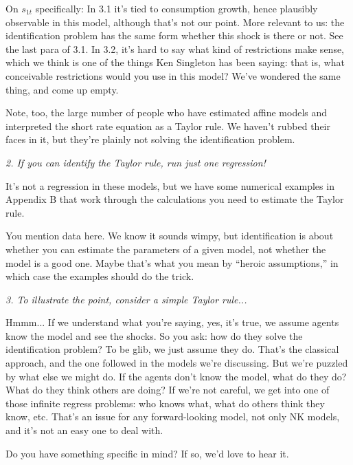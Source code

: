 \documentclass[12pt]{article}
\begin{document}
On $s_{1t}$ specifically:  In 3.1 it's tied to consumption growth, hence plausibly observable in this model, although that's not our point.  More relevant to us:  the identification problem has the same form whether this shock is there or not.
See the last para of 3.1.
In 3.2, it's hard to say what kind of restrictions make sense,
which we think is one of the things Ken Singleton has been saying:
that is, what conceivable restrictions would you use in this model?
We've wondered the same thing, and come up empty.

Note, too, the large number of people who have estimated affine models and interpreted the short rate equation as a Taylor rule.  We haven't rubbed their faces in it, but they're plainly
not solving the identification problem. %

{\it 2. If you can identify the Taylor rule, run just one regression!\/}

It's not a regression in these models, but we have some numerical examples in
Appendix B that work through the calculations you need to estimate the Taylor rule.

You mention data here.
We know it sounds wimpy, but identification is about whether you can estimate the parameters
of a given model, not whether the model is a good one.
Maybe that's what you mean by ``heroic assumptions,''
in which case the examples should do the trick.

{\it 3. To illustrate the point, consider a simple Taylor rule...\/}

Hmmm...  If we understand what you're saying, yes, it's true, we assume agents know the model
and see the shocks.  So you ask:  how do they solve the identification problem?  To be glib, we just assume they do.  %
That's the classical approach, and the one followed in the models we're discussing.
But we're puzzled by what else we might do.
If the agents don't know the model, what do they do?
What do they think others are doing?
If we're not careful, we get into one of those infinite regress problems:
who knows what, what do others think they know, etc.
That's an issue for any forward-looking model, not only NK models, and it's not an easy one to deal with.

Do you have something specific in mind?  If so, we'd love to hear it.
\end{document}
